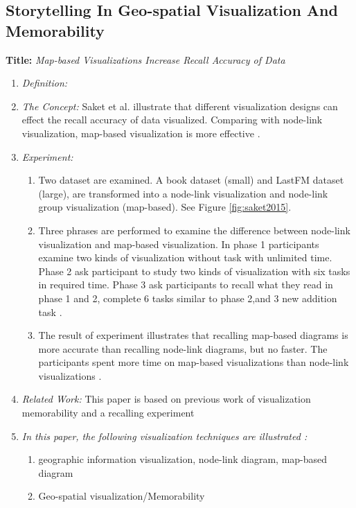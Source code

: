 \documentclass{egpubl}
\begin{document}
\subsection{Storytelling In Geo-spatial Visualization And Memorability}
\textbf{Title:} \textit{Map-based Visualizations Increase Recall Accuracy of Data}
\begin{enumerate}
\item \textit{Definition:}  
\item \textit{The Concept:} Saket et al. illustrate that different visualization designs can effect the recall accuracy of data visualized. Comparing with node-link visualization, map-based visualization is more effective \cite{saket2015}.
\item  \textit{Experiment:} 
\begin{enumerate}
\item Two dataset are examined. A book dataset (small) and LastFM dataset (large), are transformed into a node-link visualization and node-link group visualization (map-based). See Figure \ref{fig:saket2015}.
\item Three phrases are performed to examine the difference between node-link visualization and map-based visualization. In phase 1 participants examine two kinds of visualization without task with unlimited time. Phase 2 ask participant to study two kinds of visualization with six tasks in required time. Phase 3 ask participants to recall what they read in phase 1 and 2, complete 6 tasks similar to phase 2,and 3 new addition task \cite{saket2015}.
\item The result of experiment illustrates that recalling map-based diagrams is more accurate than recalling node-link diagrams, but no faster.
The participants spent more time on map-based visualizations than node-link visualizations \cite{saket2015}.  
\end{enumerate}
\item \textit{Related Work:} This paper is based on previous work of visualization memorability \cite{bateman} and a recalling experiment \cite{isola2011}
\item \textit{In this paper, the following visualization techniques are illustrated :} 
\begin{enumerate}
\item geographic information visualization, node-link diagram, map-based diagram
\item Geo-spatial visualization/Memorability
\end{enumerate}
\end{enumerate}
\end{document}
